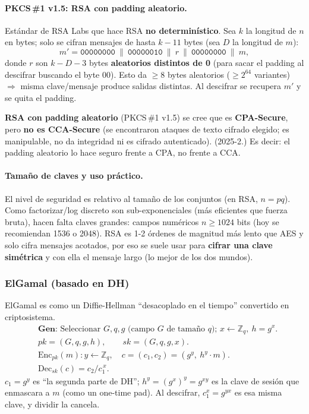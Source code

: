 \documentclass[../main.tex]{subfiles}
\begin{document}
\paragraph{PKCS\,\#1 v1.5: RSA con padding aleatorio.} Estándar de RSA Labs que
hace RSA \textbf{no determinístico}. Sea $k$ la longitud de $n$ en bytes; solo se
cifran mensajes de hasta $k-11$ bytes (sea $D$ la longitud de $m$):
\[ m' = \texttt{00000000}\ \|\ \texttt{00000010}\ \|\ r\ \|\ \texttt{00000000}\ \|\ m, \]
donde $r$ son $k-D-3$ bytes \textbf{aleatorios distintos de 0} (para sacar el
padding al descifrar buscando el byte 00). Esto da $\ge 8$ bytes aleatorios
($\ge 2^{64}$ variantes) $\Rightarrow$ misma clave/mensaje produce salidas
distintas. Al descifrar se recupera $m'$ y se quita el padding.

\begin{examen}
\textbf{RSA con padding aleatorio} (PKCS\,\#1 v1.5) se cree que es
\textbf{CPA-Secure}, pero \textbf{no es CCA-Secure} (se encontraron ataques de
texto cifrado elegido; es manipulable, no da integridad ni es cifrado
autenticado). (2025-2.) Es decir: el padding aleatorio lo hace seguro frente a
CPA, no frente a CCA.
\end{examen}

\paragraph{Tamaño de claves y uso práctico.} El nivel de seguridad es relativo al
tamaño de los conjuntos (en RSA, $n=pq$). Como factorizar/log discreto son
sub-exponenciales (más eficientes que fuerza bruta), hacen falta claves grandes:
campos numéricos $n\ge 1024$ bits (hoy se recomiendan 1536 o 2048). RSA es 1-2
órdenes de magnitud más lento que AES y solo cifra mensajes acotados, por eso se
suele usar para \textbf{cifrar una clave simétrica} y con ella el mensaje largo
(lo mejor de los dos mundos).

\subsubsection{ElGamal (basado en DH)}

ElGamal es como un Diffie-Hellman ``desacoplado en el tiempo'' convertido en
criptosistema.
\begin{align*}
&\textbf{Gen: } \text{Seleccionar } G,q,g \text{ (campo $G$ de tamaño $q$); } x\leftarrow\mathbb{Z}_q,\ h=g^x.\\
&pk=(G,q,g,h),\qquad sk=(G,q,g,x).\\
&\mathrm{Enc}_{pk}(m): y\leftarrow\mathbb{Z}_q,\quad c=(c_1,c_2)=(g^y,\ h^y\cdot m).\\
&\mathrm{Dec}_{sk}(c)=c_2/c_1^{\,x}.
\end{align*}
$c_1=g^y$ es ``la segunda parte de DH''; $h^y=(g^x)^y=g^{xy}$ es la clave de sesión
que enmascara a $m$ (como un one-time pad). Al descifrar, $c_1^x=g^{yx}$ es esa
misma clave, y dividir la cancela.
\end{document}
